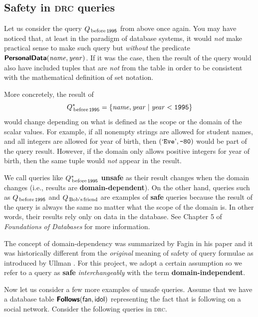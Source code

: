\subsection{Safety in \textsc{drc} queries}

\noindent
Let us consider the query $Q_\text{\,before\,\ensuremath{\text{\textnormal{\ttfamily{1995}}}}}$ from above once again. You may have noticed that, at least in the paradigm of database systems, it would \emph{not} make practical sense to make such query but \emph{without} the predicate $\text{\textnormal{\textsf{\textbf{PersonalData}}}}(\mathit{name}, \mathit{year})$. If it was the case, then the result of the query would also have included tuples that are \emph{not} from the table  in order to be consistent with the mathematical definition of set notation.

More concretely, the result of
\[
    Q^*_\text{\,before\,\ensuremath{\text{\textnormal{\ttfamily{1995}}}}} = \{\mathit{name}, \mathit{year} \mid
        \mathit{year} < \text{\textnormal{\ttfamily{1995}}}\}
\]
would change depending on what is defined as the scope or the domain of the scalar values. For example, if all nonempty strings are allowed for student names, and all integers are allowed for year of birth, then $(\text{\textnormal{`\ttfamily{Eve}}'}, \text{\textnormal{\ttfamily{-80}}})$ would be part of the query result. However, if the domain only allows positive integers for year of birth, then the same tuple would \emph{not} appear in the result.

We call queries like $Q^*_\text{\,before\,\ensuremath{\text{\textnormal{\ttfamily{1995}}}}}$ \textbf{unsafe} as their result changes when the domain changes (i.e., results are \textbf{domain-dependent}). On the other hand, queries such as $Q_\text{\,before\,\ensuremath{\text{\textnormal{\ttfamily{1995}}}}}$ and $Q_\text{\,Bob's\,friend}$ are examples of \textbf{safe} queries because the result of the query is always the same no matter what the scope of the domain is. In other words, their results rely only on data in the database. See Chapter 5 of \emph{Foundations of Databases} \cite[p.~75]{Abiteboul:1995:FDL:551350} for more information.

The concept of domain-dependency was summarized by Fagin in his paper \cite{Fagin:1982:HCD:322344.322347} and it was historically different from the \emph{original} meaning of safety of query formulae as introduced by Ullman \cite{Ullman:1983:PDS:538906}. For this project, we adopt a certain assumption \cite{Abiteboul:1988:inria-00075707} so we refer to a query as \textbf{safe} \emph{interchangeably} with the term \textbf{domain-independent}.

\newpage
{}
Now let us consider a few more examples of unsafe queries. Assume that we have a database table $\rel{Follows}(\field{fan}, \field{idol})$ representing the fact that  is following  on a social network. Consider the following queries in \textsc{drc}.

